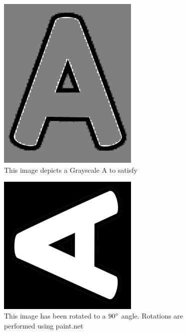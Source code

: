 \documentclass[12pt, titlepage]{article}
\begin{document}
\begin{figure}[h!]
  \begin{center}
    \includegraphics[width=0.6\textwidth]{GrayA}
  \caption{This image depicts a Grayscale A to satisfy}
  \label{Fig_grayA} 
  \end{center}
  \end{figure}

\begin{figure}[h!]
  \begin{center}
    \includegraphics[width=0.6\textwidth]{angle90p}
  \caption{This image has been rotated to a $90\degree$ angle. Rotations are performed using paint.net}
  \label{Fig_angleA} 
  \end{center}
  \end{figure}
\end{document}
